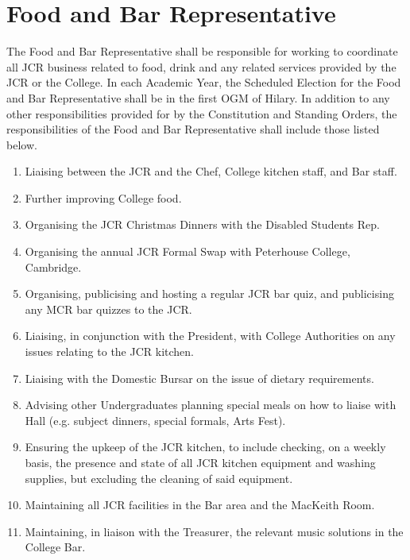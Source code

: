 \section{Food and Bar Representative}
\npara The Food and Bar Representative shall be responsible for working to coordinate all JCR business related to food, drink and any related services provided by the JCR or the College.
\npara In each Academic Year, the Scheduled Election for the Food and Bar Representative shall be in the first OGM of Hilary.
\npara In addition to any other responsibilities provided for by the Constitution and Standing Orders, the responsibilities of the Food and Bar Representative shall include those listed below.
\begin{enumerate}
	\item Liaising between the JCR and the Chef, College kitchen staff, and Bar staff. 
	\item Further improving College food. 
	\item Organising the JCR Christmas Dinners with the Disabled Students Rep.
	\item Organising the annual JCR Formal Swap with Peterhouse College, Cambridge.
	\item Organising, publicising and hosting a regular JCR bar quiz, and publicising any MCR bar quizzes to the JCR.
	\item Liaising, in conjunction with the President, with College Authorities on any issues relating to the JCR kitchen. 
	\item Liaising with the Domestic Bursar on the issue of dietary requirements.
	\item Advising other Undergraduates planning special meals on how to liaise with Hall (e.g. subject dinners, special formals, Arts Fest).
	\item Ensuring the upkeep of the JCR kitchen, to include checking, on a weekly basis, the presence and state of all JCR kitchen equipment and washing supplies, but excluding the cleaning of said equipment. 
	\item Maintaining all JCR facilities in the Bar area and the MacKeith Room.
	\item Maintaining, in liaison with the Treasurer, the relevant music solutions in the College Bar.
\end{enumerate}
